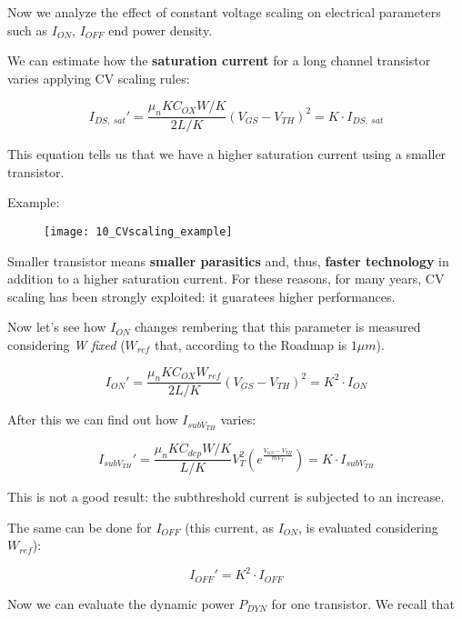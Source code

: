 \documentclass[a4paper, 12pt, twoside, openright]{report}
\begin{document}
Now we analyze the effect of constant voltage scaling on electrical parameters such as $I_{ON}$, $I_{OFF}$ end power density.

We can estimate how the \textbf{saturation current} for a long channel transistor varies applying CV scaling rules:

\begin{equation}
I_{DS,\ sat}' = \frac{\mu_n K C_{OX} W/K}{2 L/K}(V_{GS} - V_{TH})^2 = K \cdot I_{DS,\ sat}
\end{equation}

This equation tells us that we have a higher saturation current using a smaller transistor.

Example:

	\begin{figure}[H]
	\centering
	\texttt{[image: 10\_CVscaling\_example]}
	\caption{}
	\label{}
	\end{figure}

Smaller transistor means \textbf{smaller parasitics} and, thus, \textbf{faster technology} in addition to a higher saturation current. For these reasons, for many years, CV scaling has been strongly exploited: it guaratees higher performances.

Now let's see how  $I_{ON}$ changes rembering that this parameter is measured considering \emph{W fixed} ($W_{ref}$ that, according to the Roadmap is $1 \mu m$).

	\begin{equation}
	I_{ON}' = \frac{\mu_n K C_{OX} W_{ref}}{2 L/K}(V_{GS} - V_{TH})^2 = K^2 \cdot I_{ON}
	\end{equation}

After this we can find out how $I_{subV_{TH}}$ varies:

	\begin{equation}
	I_{subV_{TH}}' = \frac{\mu_n K C_{dep} W/K}{L/K} V_{T}^2 \left( e^{\frac{V_{GS} - V_{TH}}{mV_T}} \right) = K \cdot I_{subV_{TH}}
	\end{equation}

This is not a good result: the subthreshold current is subjected to an increase.

The same can be done for $I_{OFF}$ (this current, as $I_{ON}$, is evaluated considering $W_{ref}$):

	\begin{equation}
	I_{OFF}' = K^2 \cdot I_{OFF}
	\end{equation}

Now we can evaluate the dynamic power $P_{DYN}$ for one transistor. We recall that
\end{document}
